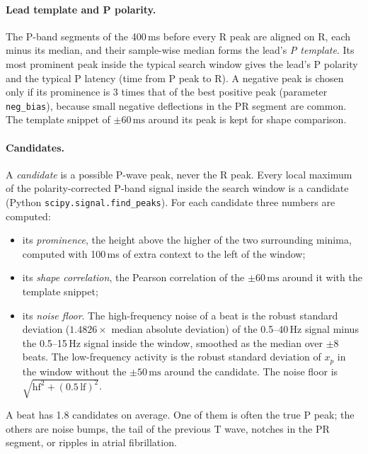 \documentclass[11pt,a4paper]{article}
\newcommand{\code}[1]{\texttt{#1}}
\newcommand{\ms}{\,\mathrm{ms}}
\begin{document}
\paragraph{Lead template and P polarity.} The P-band segments of the 400\,ms before every R peak are aligned on R, each minus its median, and their sample-wise median forms the lead's \emph{P template}. Its most prominent peak inside the typical search window gives the lead's P polarity and the typical P latency (time from P peak to R). A negative peak is chosen only if its prominence is 3 times that of the best positive peak (parameter \code{neg\_bias}), because small negative deflections in the PR segment are common. The template snippet of $\pm60\ms$ around its peak is kept for shape comparison.

\paragraph{Candidates.} A \emph{candidate} is a possible P-wave peak, never the R peak. Every local maximum of the polarity-corrected P-band signal inside the search window is a candidate (Python \code{scipy.signal.find\_peaks}). For each candidate three numbers are computed:
\begin{itemize}
\item its \emph{prominence}, the height above the higher of the two surrounding minima, computed with 100\,ms of extra context to the left of the window;
\item its \emph{shape correlation}, the Pearson correlation of the $\pm60\ms$ around it with the template snippet;
\item its \emph{noise floor}. The high-frequency noise of a beat is the robust standard deviation ($1.4826 \times$ median absolute deviation) of the 0.5--40\,Hz signal minus the 0.5--15\,Hz signal inside the window, smoothed as the median over $\pm8$ beats. The low-frequency activity is the robust standard deviation of $x_p$ in the window without the $\pm50\ms$ around the candidate. The noise floor is $\sqrt{\text{hf}^2 + (0.5\,\text{lf})^2}$.
\end{itemize}
A beat has 1.8 candidates on average. One of them is often the true P peak; the others are noise bumps, the tail of the previous T wave, notches in the PR segment, or ripples in atrial fibrillation.
\end{document}
